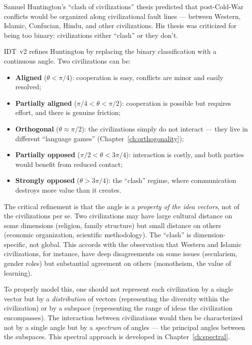 \begin{interpretation}
\label{interp:huntington}
Samuel Huntington's ``clash of civilizations'' thesis predicted that
post-Cold-War conflicts would be organized along civilizational fault lines
--- between Western, Islamic, Confucian, Hindu, and other civilizations. His
thesis was criticized for being too binary: civilizations either ``clash'' or
they don't.

IDT~v2 refines Huntington by replacing the binary classification with a
continuous angle. Two civilizations can be:
\begin{itemize}
\item \textbf{Aligned} ($\theta < \pi/4$): cooperation is easy, conflicts are
minor and easily resolved;
\item \textbf{Partially aligned} ($\pi/4 < \theta < \pi/2$): cooperation is
possible but requires effort, and there is genuine friction;
\item \textbf{Orthogonal} ($\theta \approx \pi/2$): the civilizations simply do
not interact --- they live in different ``language games'' (Chapter~\ref{ch:orthogonality});
\item \textbf{Partially opposed} ($\pi/2 < \theta < 3\pi/4$): interaction is
costly, and both parties would benefit from reduced contact;
\item \textbf{Strongly opposed} ($\theta > 3\pi/4$): the ``clash'' regime, where
communication destroys more value than it creates.
\end{itemize}

The critical refinement is that the angle is a \emph{property of the idea
vectors}, not of the civilizations per se. Two civilizations may have large
cultural distance on some dimensions (religion, family structure) but small
distance on others (economic organization, scientific methodology). The
``clash'' is dimension-specific, not global. This accords with the observation
that Western and Islamic civilizations, for instance, have deep disagreements
on some issues (secularism, gender roles) but substantial agreement on others
(monotheism, the value of learning).

To properly model this, one should not represent each civilization by a single
vector but by a \emph{distribution} of vectors (representing the diversity
within the civilization) or by a subspace (representing the range of ideas
the civilization encompasses). The interaction between civilizations would then
be characterized not by a single angle but by a \emph{spectrum} of angles
--- the principal angles between the subspaces. This spectral approach is
developed in Chapter~\ref{ch:spectral}.
\end{interpretation}


